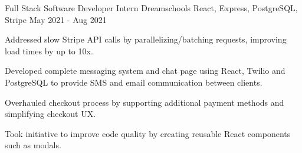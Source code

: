 \begin{cventries}
  \cventry
    {Full Stack Software Developer Intern} %
    {Dreamschools} %
    {React, Express, PostgreSQL, Stripe} %
    {May 2021 - Aug 2021} %
    {
      \begin{cvitems} %
        \item {Addressed slow Stripe API calls by parallelizing/batching requests, improving load times by up to 10x.}
        \item {Developed complete messaging system and chat page using React, Twilio and PostgreSQL to provide SMS and email communication between clients.}
        \item {Overhauled checkout process by supporting additional payment methods and simplifying checkout UX.}
        \item {Took initiative to improve code quality by creating reusable React components such as modals.}
      \end{cvitems}
    }
\end{cventries}
